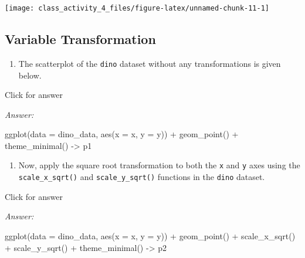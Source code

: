 \documentclass[
]{book}
\newenvironment{Shaded}{\begin{snugshade}}{\end{snugshade}}
\newcommand{\AttributeTok}[1]{\textcolor[rgb]{0.77,0.63,0.00}{#1}}
\newcommand{\FunctionTok}[1]{\textcolor[rgb]{0.00,0.00,0.00}{#1}}
\newcommand{\NormalTok}[1]{#1}
\newcommand{\OtherTok}[1]{\textcolor[rgb]{0.56,0.35,0.01}{#1}}
\newcommand{\SpecialCharTok}[1]{\textcolor[rgb]{0.00,0.00,0.00}{#1}}
\providecommand{\tightlist}{%
  \setlength{\itemsep}{0pt}\setlength{\parskip}{0pt}}
\begin{document}
\texttt{[image: class\_activity\_4\_files/figure-latex/unnamed-chunk-11-1]}

\hypertarget{variable-transformation}{%
\subsection{Variable Transformation}\label{variable-transformation}}

\begin{enumerate}
\def\labelenumi{\alph{enumi}.}
\tightlist
\item
  The scatterplot of the \texttt{dino} dataset without any transformations is given below.
\end{enumerate}

Click for answer

\emph{Answer:}

\begin{Shaded}
\begin{Highlighting}[]
\FunctionTok{ggplot}\NormalTok{(}\AttributeTok{data =}\NormalTok{ dino\_data, }\FunctionTok{aes}\NormalTok{(}\AttributeTok{x =}\NormalTok{ x, }\AttributeTok{y =}\NormalTok{ y)) }\SpecialCharTok{+}
  \FunctionTok{geom\_point}\NormalTok{() }\SpecialCharTok{+}
  \FunctionTok{theme\_minimal}\NormalTok{() }\OtherTok{{-}\textgreater{}}\NormalTok{ p1}
\end{Highlighting}
\end{Shaded}

\begin{enumerate}
\def\labelenumi{\alph{enumi}.}
\setcounter{enumi}{1}
\tightlist
\item
  Now, apply the square root transformation to both the \texttt{x} and \texttt{y} axes using the \texttt{scale\_x\_sqrt()} and \texttt{scale\_y\_sqrt()} functions in the \texttt{dino} dataset.
\end{enumerate}

Click for answer

\emph{Answer:}

\begin{Shaded}
\begin{Highlighting}[]
\FunctionTok{ggplot}\NormalTok{(}\AttributeTok{data =}\NormalTok{ dino\_data, }\FunctionTok{aes}\NormalTok{(}\AttributeTok{x =}\NormalTok{ x, }\AttributeTok{y =}\NormalTok{ y)) }\SpecialCharTok{+}
  \FunctionTok{geom\_point}\NormalTok{() }\SpecialCharTok{+}
  \FunctionTok{scale\_x\_sqrt}\NormalTok{() }\SpecialCharTok{+}
  \FunctionTok{scale\_y\_sqrt}\NormalTok{() }\SpecialCharTok{+}
  \FunctionTok{theme\_minimal}\NormalTok{() }\OtherTok{{-}\textgreater{}}\NormalTok{ p2}
\end{Highlighting}
\end{Shaded}
\end{document}
